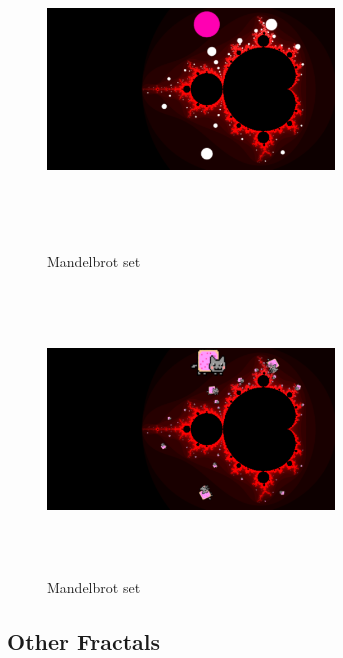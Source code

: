 \begin{figure}[htbp]
 \begin{minipage}{0.49\hsize}
  \begin{center}
   \includegraphics[width=3in, height=3in, keepaspectratio]{../img/fractal/mandelbrot-orbit.pdf}
    \caption{Mandelbrot set}
    \label{fig:mandelbrotOrbit}
  \end{center}
 \end{minipage}
 \begin{minipage}{0.49\hsize}
  \begin{center}
   \includegraphics[width=3in, height=3in, keepaspectratio]{../img/fractal/mandelbrot-bitmap.pdf}
   \caption{Mandelbrot set}
   \label{fig:mandelbrotBitmap}
  \end{center}
 \end{minipage}
\end{figure}

\subsection{Other Fractals}

